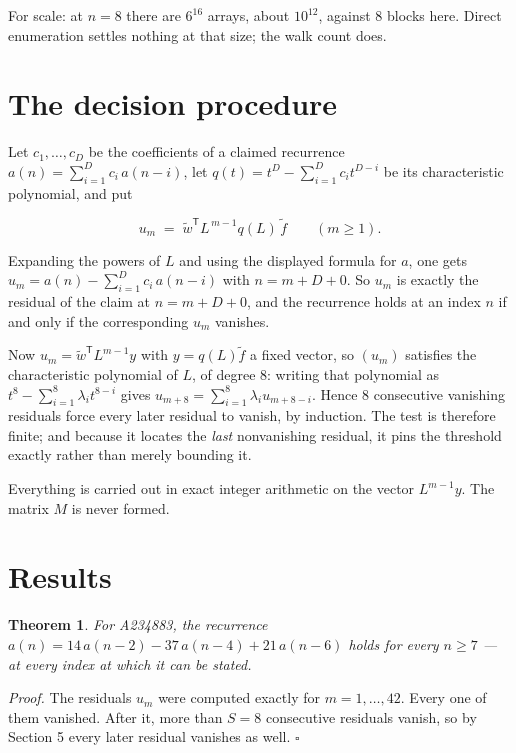 \documentclass[11pt]{article}
\newtheorem{theorem}{Theorem}
\theoremstyle{definition}
\begin{document}
For scale: at $n = 8$ there are $6^{16}$ arrays, about $10^{12}$, against $8$ blocks here. Direct enumeration settles nothing at that size; the walk count does.

\section{The decision procedure}

Let $c_1,\dots,c_D$ be the coefficients of a claimed recurrence $a(n) = \sum_{i=1}^{D} c_i\,a(n-i)$, let $q(t) = t^{D} - \sum_{i=1}^{D} c_i t^{D-i}$ be its characteristic polynomial, and put

\[u_m \;=\; \tilde w^{\mathsf T} L^{\,m-1} q(L)\,\tilde f \qquad (m \ge 1).\]

Expanding the powers of $L$ and using the displayed formula for $a$, one gets $u_m = a(n) - \sum_{i=1}^{D} c_i\,a(n-i)$ with $n = m + D + 0$. So $u_m$ is exactly the residual of the claim at $n = m + D + 0$, and the recurrence holds at an index $n$ if and only if the corresponding $u_m$ vanishes.

Now $u_m = \tilde w^{\mathsf T} L^{m-1} y$ with $y = q(L)\tilde f$ a fixed vector, so $(u_m)$ satisfies the characteristic polynomial of $L$, of degree $8$: writing that polynomial as $t^{8} - \sum_{i=1}^{8} \lambda_i t^{8-i}$ gives $u_{m+8} = \sum_{i=1}^{8} \lambda_i u_{m+8-i}$. Hence $8$ consecutive vanishing residuals force every later residual to vanish, by induction. The test is therefore finite; and because it locates the {\itshape last} nonvanishing residual, it pins the threshold exactly rather than merely bounding it.

Everything is carried out in exact integer arithmetic on the vector $L^{m-1}y$. The matrix $M$ is never formed.

\section{Results}

\begin{theorem} For A234883, the recurrence $a(n) = 14\,a(n-2) - 37\,a(n-4) + 21\,a(n-6)$ holds for every $n \ge 7$ --- at every index at which it can be stated.\end{theorem}

{\itshape Proof.} The residuals $u_m$ were computed exactly for $m = 1,\dots,42$. Every one of them vanished. After it, more than $S = 8$ consecutive residuals vanish, so by Section 5 every later residual vanishes as well. $\square$
\end{document}
